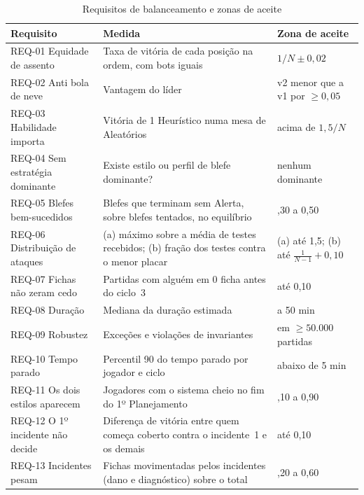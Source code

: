 \begin{table}[ht]
  \centering
  \caption{Requisitos de balanceamento e zonas de aceite}
  \label{tab:requisitos}
  \footnotesize
  \begin{tabularx}{\linewidth}{>{\raggedright\arraybackslash}p{3.1cm} >{\raggedright\arraybackslash}X
      >{\raggedright\arraybackslash}p{3.3cm}}
    \toprule
    Requisito & Medida & Zona de aceite \\
    \midrule
    REQ-01 Equidade de assento & Taxa de vitória de cada posição na ordem, com bots iguais & $1/N \pm 0{,}02$ \\
    REQ-02 Anti bola de neve & Vantagem do líder & v2 menor que a v1 por $\geq 0{,}05$ \\
    REQ-03 Habilidade importa & Vitória de 1 Heurístico numa mesa de Aleatórios & acima de $1{,}5/N$ \\
    REQ-04 Sem estratégia dominante & Existe estilo ou perfil de blefe dominante? & nenhum dominante \\
    REQ-05 Blefes bem-sucedidos & Blefes que terminam sem Alerta, sobre blefes tentados, no equilíbrio & 0,30 a 0,50 \\
    REQ-06 Distribuição de ataques & (a) máximo sobre a média de testes recebidos; (b) fração dos testes contra o menor placar & (a) até 1,5; (b) até $\frac{1}{N-1}+0{,}10$ \\
    REQ-07 Fichas não zeram cedo & Partidas com alguém em 0 ficha antes do ciclo~3 & até 0,10 \\
    REQ-08 Duração & Mediana da duração estimada & 40 a 50 min \\
    REQ-09 Robustez & Exceções e violações de invariantes & 0 em $\geq 50.000$ partidas \\
    REQ-10 Tempo parado & Percentil 90 do tempo parado por jogador e ciclo & abaixo de 5 min \\
    REQ-11 Os dois estilos aparecem & Jogadores com o sistema cheio no fim do 1º Planejamento & 0,10 a 0,90 \\
    REQ-12 O 1º incidente não decide & Diferença de vitória entre quem começa coberto contra o incidente~1 e os demais & até 0,10 \\
    REQ-13 Incidentes pesam & Fichas movimentadas pelos incidentes (dano e diagnóstico) sobre o total & 0,20 a 0,60 \\
    \bottomrule
  \end{tabularx}
\end{table}

